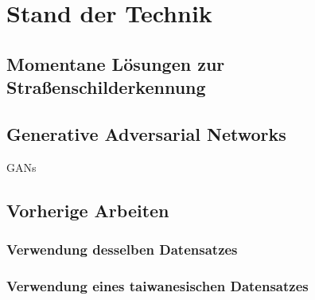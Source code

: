 \chapter{Stand der Technik}
\section{Momentane Lösungen zur Straßenschilderkennung}
\section{Generative Adversarial Networks}
\acp{GAN}
\cite{Goodfellow-et-al-2016}
\cite{visualApproach}
\section{Vorherige Arbeiten}
\subsection{Verwendung desselben Datensatzes}
\cite{gtsrbGAN}
\subsection{Verwendung eines taiwanesischen Datensatzes}
\cite{taiwanGAN}